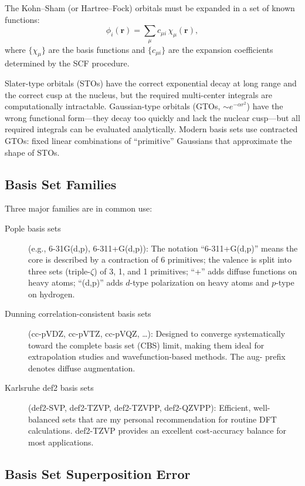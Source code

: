 \documentclass[11pt]{article}
\numberwithin{equation}{section}
\begin{document}
The Kohn--Sham (or Hartree--Fock) orbitals must be expanded in a set of known functions:
\begin{equation}
\phi_i(\mathbf{r}) = \sum_\mu c_{\mu i}\,\chi_\mu(\mathbf{r}),
\end{equation}
where $\{\chi_\mu\}$ are the basis functions and $\{c_{\mu i}\}$ are the expansion coefficients determined by the SCF procedure.

Slater-type orbitals (STOs) have the correct exponential decay at long range and the correct cusp at the nucleus, but the required multi-center integrals are computationally intractable. Gaussian-type orbitals (GTOs, $\sim e^{-\alpha r^2}$) have the wrong functional form---they decay too quickly and lack the nuclear cusp---but all required integrals can be evaluated analytically. Modern basis sets use contracted GTOs: fixed linear combinations of ``primitive'' Gaussians that approximate the shape of STOs.

\subsection{Basis Set Families}

Three major families are in common use:

\begin{description}
\item[Pople basis sets] (e.g., 6-31G(d,p), 6-311+G(d,p)): The notation ``6-311+G(d,p)'' means the core is described by a contraction of 6 primitives; the valence is split into three sets (triple-$\zeta$) of 3, 1, and 1 primitives; ``+'' adds diffuse functions on heavy atoms; ``(d,p)'' adds $d$-type polarization on heavy atoms and $p$-type on hydrogen.

\item[Dunning correlation-consistent basis sets] (cc-pVDZ, cc-pVTZ, cc-pVQZ, \ldots): Designed to converge systematically toward the complete basis set (CBS) limit, making them ideal for extrapolation studies and wavefunction-based methods. The aug- prefix denotes diffuse augmentation.

\item[Karlsruhe def2 basis sets] (def2-SVP, def2-TZVP, def2-TZVPP, def2-QZVPP): Efficient, well-balanced sets that are my personal recommendation for routine DFT calculations. def2-TZVP provides an excellent cost-accuracy balance for most applications.
\end{description}

\subsection{Basis Set Superposition Error}
\end{document}
